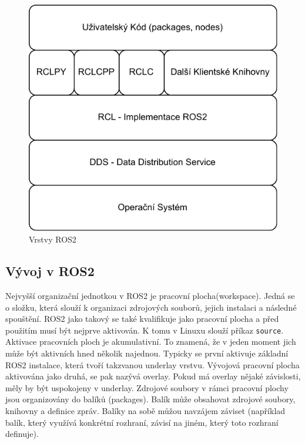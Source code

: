 \begin{figure}[h!]
	\centering
	\includegraphics[scale=0.75]{obrazky-figures/ros_layers.pdf}
	\caption{Vrstvy ROS2}
	\label{fig:ros_layers}
\end{figure}

\subsection*{Vývoj v ROS2}
Nejvyšší organizační jednotkou v ROS2 je pracovní plocha(workspace). Jedná se o složku, která slouží k organizaci zdrojových souborů, jejich instalaci a následné spouštění. ROS2 jako takový se také kvalifikuje jako pracovní plocha a před použitím musí být nejprve aktivován. K tomu v Linuxu slouží příkaz \verb|source|. Aktivace pracovních ploch je akumulativní. To znamená, že v jeden moment jich může být aktivních hned několik najednou. Typicky se první aktivuje základní ROS2 instalace, která tvoří takzvanou underlay vrstvu. Vývojová pracovní plocha aktivována jako druhá, se pak nazývá overlay. Pokud má overlay nějaké závislosti, měly by být uspokojeny v underlay.
Zdrojové soubory v rámci pracovní plochy jsou organizovány do balíků (packages). Balík může obsahovat zdrojové soubory, knihovny a definice zpráv. Balíky na sobě můžou navzájem záviset (například balík, který využívá konkrétní rozhraní, závisí na jiném, který toto rozhraní definuje). \cite[str:~10-11]{ros2_introduction} 


